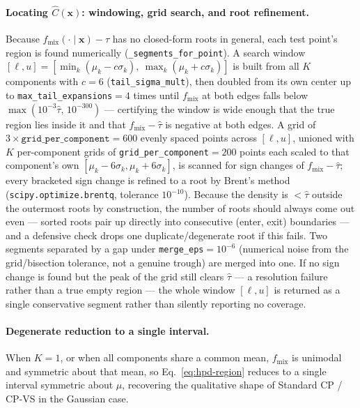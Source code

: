 \documentclass[11pt]{article}
\begin{document}
\paragraph{Locating $\hat C(\bm x)$: windowing, grid search, and root refinement.} Because
$f_{\mathrm{mix}}(\cdot\mid\bm x)-\hat\tau$ has no closed-form roots in general, each test
point's region is found numerically (\texttt{\_segments\_for\_point}). A search window
$[\ell,u]=[\min_k(\mu_k-c\sigma_k),\ \max_k(\mu_k+c\sigma_k)]$ is built from all $K$ components
with $c=6$ (\texttt{tail\_sigma\_mult}), then doubled from its own center up to
\texttt{max\_tail\_expansions}$=4$ times until $f_{\mathrm{mix}}$ at both edges falls below
$\max(10^{-3}\hat\tau,\,10^{-300})$ — certifying the window is wide enough that the true region
lies inside it and that $f_{\mathrm{mix}}-\hat\tau$ is negative at both edges. A grid of
$3\times\texttt{grid\_per\_component}=600$ evenly spaced points across $[\ell,u]$, unioned with
$K$ per-component grids of \texttt{grid\_per\_component}$=200$ points each scaled to that
component's own $[\mu_k-6\sigma_k,\mu_k+6\sigma_k]$, is scanned for sign changes of
$f_{\mathrm{mix}}-\hat\tau$; every bracketed sign change is refined to a root by Brent's method
(\texttt{scipy.optimize.brentq}, tolerance $10^{-10}$). Because the density is $<\hat\tau$
outside the outermost roots by construction, the number of roots should always come out even —
sorted roots pair up directly into consecutive (enter, exit) boundaries — and a defensive check
drops one duplicate/degenerate root if this fails. Two segments separated by a gap under
\texttt{merge\_eps}$=10^{-6}$ (numerical noise from the grid/bisection tolerance, not a genuine
trough) are merged into one. If no sign change is found but the peak of the grid still clears
$\hat\tau$ — a resolution failure rather than a true empty region — the whole window $[\ell,u]$
is returned as a single conservative segment rather than silently reporting no coverage.

\paragraph{Degenerate reduction to a single interval.} When $K=1$, or when all components share
a common mean, $f_{\mathrm{mix}}$ is unimodal and symmetric about that mean, so
Eq.~\eqref{eq:hpd-region} reduces to a single interval symmetric about $\mu$, recovering the
qualitative shape of Standard CP / CP-VS in the Gaussian case.
\end{document}

